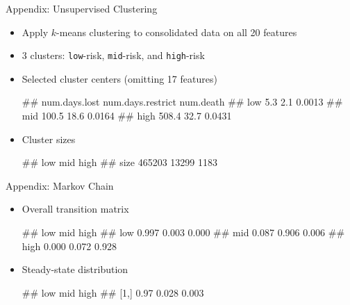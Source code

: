 \documentclass[]{beamer}
\providecommand{\tightlist}{%
  \setlength{\itemsep}{0pt}\setlength{\parskip}{0pt}}
\let\oldverbatim\verbatim
\let\endoldverbatim\endverbatim
\renewenvironment{verbatim}{\footnotesize\oldverbatim}{\endoldverbatim}
\begin{document}
\begin{frame}[fragile]{Appendix: Unsupervised Clustering}

\begin{itemize}[<+->]
\tightlist
\item
  Apply \(k\)-means clustering to consolidated data on all 20 features
\item
  3 clusters: \texttt{low}-risk, \texttt{mid}-risk, and
  \texttt{high}-risk
\item
  Selected cluster centers (omitting 17 features)


\begin{verbatim}
##      num.days.lost num.days.restrict num.death
## low            5.3               2.1    0.0013
## mid          100.5              18.6    0.0164
## high         508.4              32.7    0.0431
\end{verbatim}

\item
  Cluster sizes

\begin{verbatim}
##         low   mid high
## size 465203 13299 1183
\end{verbatim}
\end{itemize}
\end{frame}

\begin{frame}[fragile]{Appendix: Markov Chain}

\begin{itemize}[<+->]
\tightlist
\item
  Overall transition matrix

\begin{verbatim}
##        low   mid  high
## low  0.997 0.003 0.000
## mid  0.087 0.906 0.006
## high 0.000 0.072 0.928
\end{verbatim}

\item
  Steady-state distribution


\begin{verbatim}
##       low   mid  high
## [1,] 0.97 0.028 0.003
\end{verbatim}
\end{itemize}
\end{frame}
\end{document}
